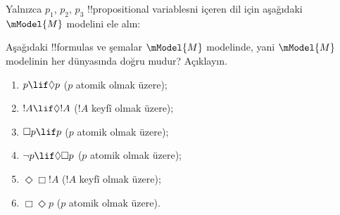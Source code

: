 \begin{prob}
  Yalnızca $p_1$, $p_2$, $p_3$ !!{propositional variable}s{}ni içeren dil
  için aşağıdaki $\mModel{M}$ modelini ele alın:
  \begin{center}
  \end{center}
  Aşağıdaki !!{formula}s ve şemalar $\mModel{M}$ modelinde, yani
  $\mModel{M}$ modelinin her dünyasında doğru mudur? Açıklayın.
  \begin{enumerate}
  \item $p\lif \Diamond p$ ($p$ atomik olmak üzere);
  \item $!A\lif \Diamond !A$ ($!A$ keyfî olmak üzere);
  \item $\Box p \lif p$ ($p$ atomik olmak üzere);
  \item $\lnot p \lif \Diamond \Box p$ ($p$ atomik olmak üzere);
  \item $\Diamond \Box !A$ ($!A$ keyfî olmak üzere);
  \item $\Box \Diamond p$ ($p$ atomik olmak üzere).
  \end{enumerate}
\end{prob}

